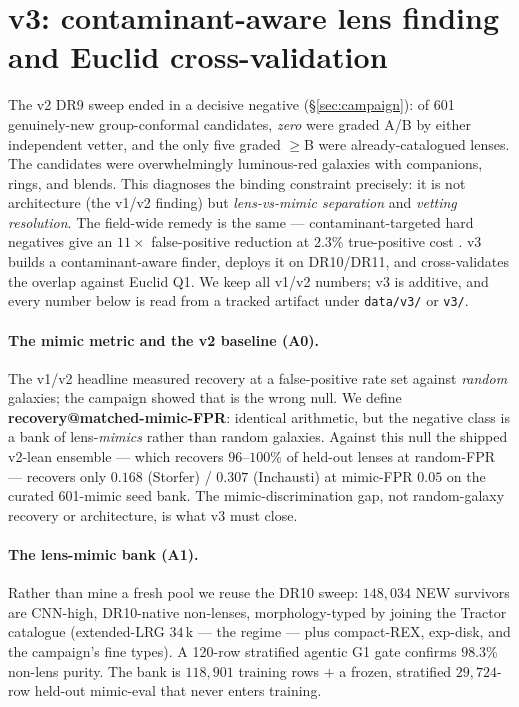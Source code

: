 \section{\cnet{} v3: contaminant-aware lens finding and Euclid cross-validation}
\label{sec:v3}
The v2 DR9 sweep ended in a decisive negative (\S\ref{sec:campaign}): of 601 genuinely-new
group-conformal candidates, \emph{zero} were graded A/B by either independent vetter, and the only
five graded $\ge$B were already-catalogued lenses. The candidates were overwhelmingly luminous-red
galaxies with companions, rings, and blends. This diagnoses the binding constraint precisely: it is
not architecture (the v1/v2 finding) but \emph{lens-vs-mimic separation} and \emph{vetting
resolution}. The field-wide remedy is the same --- contaminant-targeted hard negatives give an
$11\times$ false-positive reduction at $2.3\%$ true-positive cost \citep{staf327}. v3 builds a
contaminant-aware finder, deploys it on DR10/DR11, and cross-validates the overlap against Euclid
Q1. We keep all v1/v2 numbers; v3 is additive, and every number below is read from a tracked
artifact under \texttt{data/v3/} or \texttt{v3/}.

\paragraph{The mimic metric and the v2 baseline (A0).} The v1/v2 headline measured recovery at a
false-positive rate set against \emph{random} galaxies; the campaign showed that is the wrong null.
We define \textbf{recovery@matched-mimic-FPR}: identical arithmetic, but the negative class is a
bank of lens-\emph{mimics} rather than random galaxies. Against this null the shipped v2-lean
ensemble --- which recovers $96$--$100\%$ of held-out lenses at random-FPR --- recovers only
$0.168$ (Storfer) / $0.307$ (Inchausti) at mimic-FPR $0.05$ on the curated 601-mimic seed bank.
The mimic-discrimination gap, not random-galaxy recovery or architecture, is what v3 must close.

\paragraph{The lens-mimic bank (A1).} Rather than mine a fresh pool we reuse the DR10 sweep:
$148{,}034$ NEW survivors are CNN-high, DR10-native non-lenses, morphology-typed by joining the
Tractor catalogue (extended-LRG $34$\,k --- the \citet{staf327} regime --- plus
compact-REX, exp-disk, and the campaign's fine types). A 120-row stratified agentic G1 gate
confirms $98.3\%$ non-lens purity. The bank is $118{,}901$ training rows $+$ a frozen,
stratified $29{,}724$-row held-out mimic-eval that never enters training.


